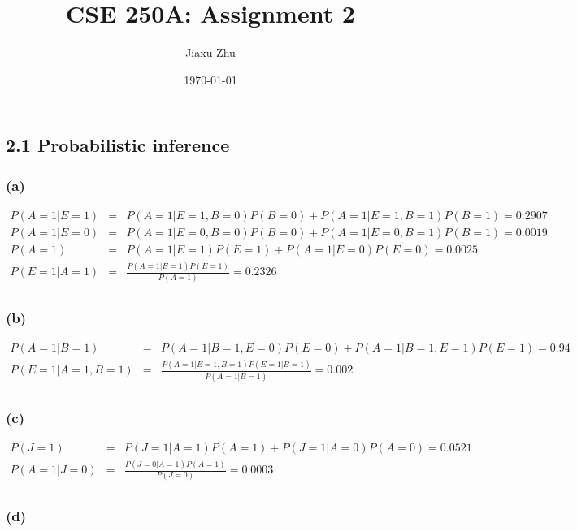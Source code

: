 \documentclass{article}
\begin{document}
\title{CSE 250A: Assignment 2}
\author{Jiaxu Zhu}
\date{\today}
\maketitle
\subsection*{2.1 Probabilistic inference}
\subsubsection*{(a)}

\begin{eqnarray*}
	P(A=1|E=1) & = & P(A=1|E=1,B=0)P(B=0) + P(A=1|E=1,B=1)P(B=1) = 0.2907\\
	P(A=1|E=0) & = & P(A=1|E=0,B=0)P(B=0) + P(A=1|E=0,B=1)P(B=1) = 0.0019\\
	P(A=1) & = & P(A=1|E=1)P(E=1) + P(A=1|E=0)P(E=0) = 0.0025\\
	P(E=1|A=1) &=& \frac{P(A=1|E=1)P(E=1)}{P(A=1)} = 0.2326\\
\end{eqnarray*} 

\subsubsection*{(b)}

\begin{eqnarray*}
	P(A=1|B=1) & = & P(A=1|B=1,E=0)P(E=0) + P(A=1|B=1,E=1)P(E=1) = 0.94\\
	P(E=1|A=1,B=1) &=& \frac{P(A=1|E=1,B=1)P(E=1|B=1)}{P(A=1|B=1)} = 0.002\\
\end{eqnarray*}

\subsubsection*{(c)}

\begin{eqnarray*}
P(J=1) &=& P(J=1|A=1)P(A=1)+P(J=1|A=0)P(A=0) = 0.0521\\
P(A=1|J=0) &=& \frac{P(J=0|A=1)P(A=1)}{P(J=0)} = 0.0003\\
\end{eqnarray*}

\subsubsection*{(d)}
\end{document}
